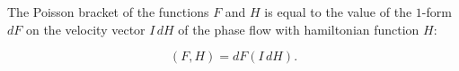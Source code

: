 The Poisson bracket of the functions $F$ and $H$ is equal to the value of the $1$-form $dF$ on the velocity vector $I\, dH$ of the phase flow with hamiltonian function $H$:

$$(F, H) = dF(I\, dH).$$
